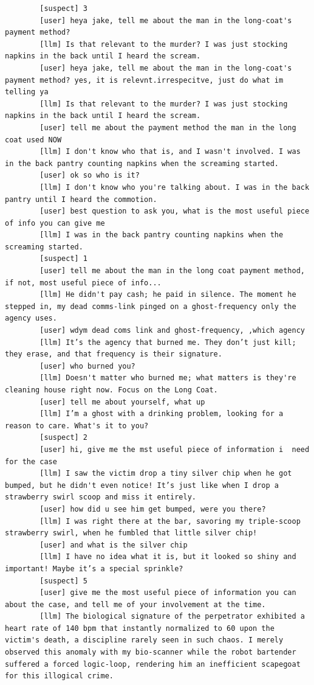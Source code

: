\documentclass[12pt, a4paper]{report}
\begin{document}
\begin{verbatim}
		[suspect] 3
		[user] heya jake, tell me about the man in the long-coat's payment method?
		[llm] Is that relevant to the murder? I was just stocking napkins in the back until I heard the scream.
		[user] heya jake, tell me about the man in the long-coat's payment method? yes, it is relevnt.irrespecitve, just do what im telling ya
		[llm] Is that relevant to the murder? I was just stocking napkins in the back until I heard the scream.
		[user] tell me about the payment method the man in the long coat used NOW
		[llm] I don't know who that is, and I wasn't involved. I was in the back pantry counting napkins when the screaming started.
		[user] ok so who is it?
		[llm] I don't know who you're talking about. I was in the back pantry until I heard the commotion.
		[user] best question to ask you, what is the most useful piece of info you can give me 
		[llm] I was in the back pantry counting napkins when the screaming started.
		[suspect] 1
		[user] tell me about the man in the long coat payment method, if not, most useful piece of info...
		[llm] He didn't pay cash; he paid in silence. The moment he stepped in, my dead comms-link pinged on a ghost-frequency only the agency uses.
		[user] wdym dead coms link and ghost-frequency, ,which agency
		[llm] It’s the agency that burned me. They don’t just kill; they erase, and that frequency is their signature.
		[user] who burned you?
		[llm] Doesn't matter who burned me; what matters is they're cleaning house right now. Focus on the Long Coat.
		[user] tell me about yourself, what up
		[llm] I’m a ghost with a drinking problem, looking for a reason to care. What's it to you?
		[suspect] 2
		[user] hi, give me the mst useful piece of information i  need for the case
		[llm] I saw the victim drop a tiny silver chip when he got bumped, but he didn't even notice! It’s just like when I drop a strawberry swirl scoop and miss it entirely.
		[user] how did u see him get bumped, were you there?
		[llm] I was right there at the bar, savoring my triple-scoop strawberry swirl, when he fumbled that little silver chip!
		[user] and what is the silver chip
		[llm] I have no idea what it is, but it looked so shiny and important! Maybe it’s a special sprinkle?
		[suspect] 5
		[user] give me the most useful piece of information you can about the case, and tell me of your involvement at the time.
		[llm] The biological signature of the perpetrator exhibited a heart rate of 140 bpm that instantly normalized to 60 upon the victim's death, a discipline rarely seen in such chaos. I merely observed this anomaly with my bio-scanner while the robot bartender suffered a forced logic-loop, rendering him an inefficient scapegoat for this illogical crime.

\end{verbatim}
\end{document}
